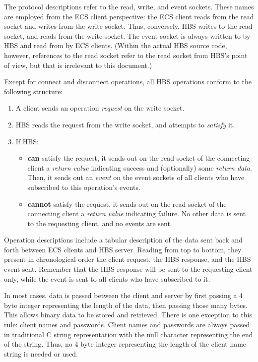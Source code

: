 \begin{itemizenoindent}
\item The protocol descriptions refer to the read, write, and event
  sockets.  These names are employed from the ECS client perspective: the ECS
  client reads from the read socket and writes from the write socket.  Thus,
  conversely, HBS writes to the read socket, and reads from the write socket.
  The event socket is always written to by HBS and read from by ECS clients.
 (Within the actual HBS source code, however, references to the read socket
  refer to the read socket from HBS's point of view, but that is irrelevant
  to this document.)

\item Except for connect and disconnect operations, all HBS
  operations conform to the following structure:
  \begin{enumerate}
  \item A client sends an operation {\em request} on the write socket.
  \item HBS reads the request from the write socket, and attempts to {\em satisfy} it.
  \item If HBS:
    \begin{itemize}
    \item {\bf can} satisfy the request, it sends out on the read socket of
      the connecting client a {\em return value} indicating success and
      (optionally) some {\em return data}.  Then, it sends out an {\em event} on the
      event sockets of all clients who have subscribed to this
      operation's events.

    \item {\bf cannot} satisfy the request, it sends out on the read
      socket of the connecting client a {\em return value} indicating
      failure.  No other data is sent to the requesting client, and
      no events are sent.
    \end{itemize}
  \end{enumerate}

\item Operation descriptions include a tabular description
  of the data sent back and forth between ECS clients and HBS
  server. Reading from top to bottom, they present in chronological order
  the client request, the HBS response, and the HBS event sent. Remember
  that the HBS response will be sent to the requesting client only, while
  the event is sent to all clients who have subscribed to it.

\item In most cases, data is passed between the client and server by first
  passing a 4 byte integer representing the length of the data, then passing
  those many bytes.  This allows binary data to be stored and
  retrieved. There is one exception to this rule: client names and 
passwords.  Client names and passwords
  are always passed in traditional C string representation with the null
  character representing the end of the string.  Thus, no 4 byte integer
  representing the length of the client name string is needed or used.


\end{itemizenoindent}
